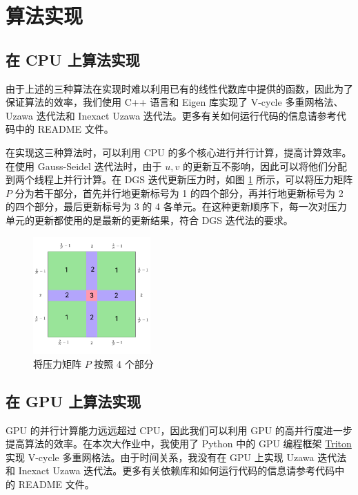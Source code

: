 \documentclass{article}
\begin{document}
\section{算法实现}

\subsection{在 CPU 上算法实现}

由于上述的三种算法在实现时难以利用已有的线性代数库中提供的函数，因此为了保证算法的效率，我们使用 C++ 语言和 Eigen 库实现了 V-cycle 多重网格法、Uzawa 迭代法和 Inexact Uzawa 迭代法。更多有关如何运行代码的信息请参考代码中的 README 文件。

在实现这三种算法时，可以利用 CPU 的多个核心进行并行计算，提高计算效率。在使用 Gauss-Seidel 迭代法时，由于 $u,v$ 的更新互不影响，因此可以将他们分配到两个线程上并行计算。在 DGS 迭代更新压力时，如图 \ref{fig:split} 所示，可以将压力矩阵 $P$ 分为若干部分，首先并行地更新标号为 1 的四个部分，再并行地更新标号为 2 的四个部分，最后更新标号为 3 的 4 各单元。在这种更新顺序下，每一次对压力单元的更新都使用的是最新的更新结果，符合 DGS 迭代法的要求。

\begin{figure}
    \centering
    \includegraphics[width=0.4\textwidth]{fig/split.pdf}
    \caption{将压力矩阵 $P$ 按照 4 个部分}
    \label{fig:split}
\end{figure}

\subsection{在 GPU 上算法实现}

GPU 的并行计算能力远远超过 CPU，因此我们可以利用 GPU 的高并行度进一步提高算法的效率。在本次大作业中，我使用了 Python 中的 GPU 编程框架 \href{https://triton-lang.org/main/index.html}{Triton} 实现 V-cycle 多重网格法。由于时间关系，我没有在 GPU 上实现 Uzawa 迭代法和 Inexact Uzawa 迭代法。更多有关依赖库和如何运行代码的信息请参考代码中的 README 文件。
\end{document}
